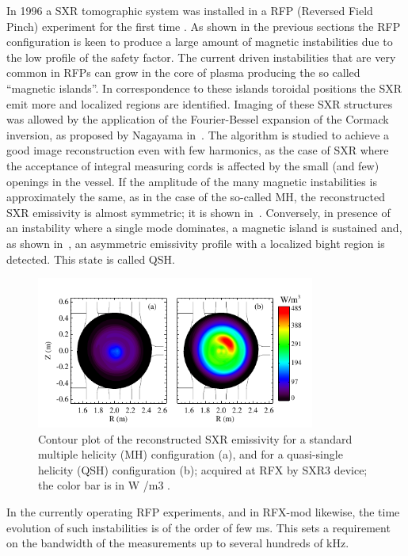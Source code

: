 In 1996 a SXR tomographic system was installed in a RFP (Reversed Field
Pinch) experiment for the first time \cite{Franz_2001}. 
As shown in the previous sections the RFP configuration is keen to produce a large amount of
magnetic instabilities due to the low profile of the safety factor. The current driven instabilities that are very common in RFPs can grow in the core of plasma producing the so called ``magnetic islands''. In correspondence to these islands toroidal positions the SXR emit more and localized regions
are identified. 
Imaging of these SXR structures was allowed by the application of the Fourier-Bessel expansion of the Cormack inversion, as proposed by Nagayama in~\cite{Bonomo25}. 
The algorithm is studied to achieve a good image reconstruction even with few harmonics, as the case of SXR where the acceptance of integral measuring cords  is affected by the small (and few) openings in the vessel. If the amplitude of the many magnetic instabilities is approximately the same, as in the case of the so-called \acl{MH}, the reconstructed SXR emissivity is almost symmetric; it is shown in~. Conversely, in presence of an instability where a single mode dominates, a magnetic island is sustained and, as shown in~, an asymmetric emissivity profile with a localized bight region is detected. This state is called \acl{QSH}.
%
\begin{figure}
    \centering
    \includegraphics[height=5cm]{img/2_eq/MH_QSH_example.png}
    \caption{Contour plot of the reconstructed SXR emissivity for a standard multiple helicity (MH) configuration (a), and for a quasi-single helicity (QSH) configuration (b); acquired at RFX by SXR3 device; the color bar is in W /m3 .
    }
    \label{fig:MH_QSH_example}
\end{figure}
%
In the currently operating RFP experiments, and in RFX-mod likewise, the time evolution of such instabilities is of the order of few ms. This sets a requirement on the bandwidth of the measurements up to several hundreds of kHz.

